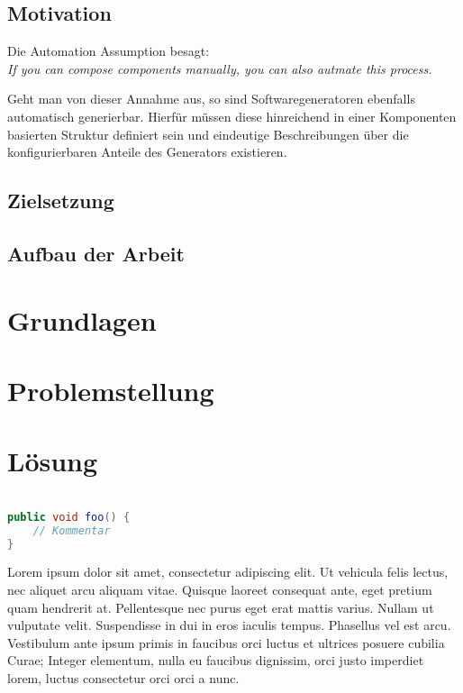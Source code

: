 \documentclass[12pt,oneside,a4paper,parskip]{scrbook}
\begin{document}
\section{Motivation}

Die Automation Assumption besagt:\\
\emph{\glqq If you can compose components manually, you can also autmate this process.\grqq} \cite{czaeis2000genprog}

Geht man von dieser Annahme aus, so sind Softwaregeneratoren ebenfalls automatisch generierbar. Hierfür müssen diese hinreichend in einer Komponenten basierten Struktur definiert sein und eindeutige Beschreibungen über die konfigurierbaren Anteile des Generators existieren.



\section{Zielsetzung}
\section{Aufbau der Arbeit}






\chapter{Grundlagen}

\chapter{Problemstellung}

\chapter{Lösung}

\begin{lstlisting}[label=lst:java,
				   language=java,
				   firstnumber=1,
				   caption=Beispiel für einen Quelltext]

public void foo() {
	// Kommentar
}
\end{lstlisting}

Lorem ipsum dolor sit amet, consectetur adipiscing elit. Ut vehicula felis lectus, nec aliquet arcu aliquam vitae. Quisque laoreet consequat ante, eget pretium quam hendrerit at. Pellentesque nec purus eget erat mattis varius. Nullam ut vulputate velit. Suspendisse in dui in eros iaculis tempus. Phasellus vel est arcu. Vestibulum ante ipsum primis in faucibus orci luctus et ultrices posuere cubilia Curae; Integer elementum, nulla eu faucibus dignissim, orci justo imperdiet lorem, luctus consectetur orci orci a nunc.
\end{document}
